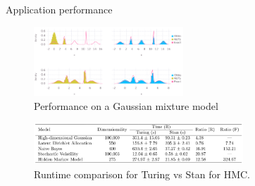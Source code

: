 \documentclass[AERbeamer%
              ,optEnglish%
              ,optBiber%
              ,optBibstyleAlphabetic%
              ,optBeamerClassicFormat%
              ]{AERlatex}%
\begin{document}
\begin{frame}[c]{Application performance}
    \centering
    \begin{figure}
        \centering
        \includegraphics[width=0.5\textwidth]{TuringAppPerformanceNUTSvsGibbs.png}
        \caption{Performance on a Gaussian mixture model}
    \end{figure}
    \begin{figure}
        \centering
        \includegraphics[width=0.7\textwidth]{TuringPerformancevsStanHMC.png}
        \caption{Runtime comparison for Turing vs Stan for HMC.}
    \end{figure}
\end{frame}
\end{document}
